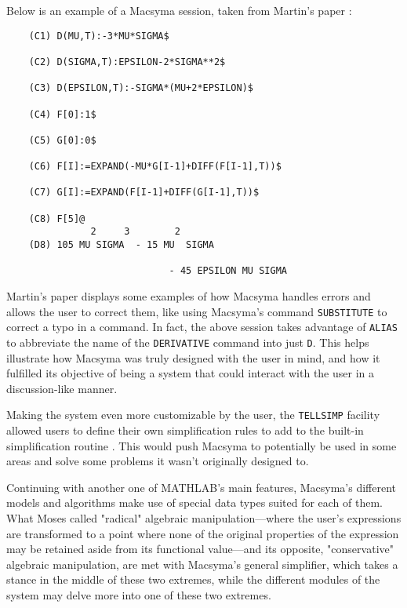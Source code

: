 Below is an example of a Macsyma session, taken from Martin's paper \parencite{martin1971macsyma}:

\begin{verbatim}
    (C1) D(MU,T):-3*MU*SIGMA$
    
    (C2) D(SIGMA,T):EPSILON-2*SIGMA**2$

    (C3) D(EPSILON,T):-SIGMA*(MU+2*EPSILON)$

    (C4) F[0]:1$

    (C5) G[0]:0$

    (C6) F[I]:=EXPAND(-MU*G[I-1]+DIFF(F[I-1],T))$

    (C7) G[I]:=EXPAND(F[I-1]+DIFF(G[I-1],T))$

    (C8) F[5]@
               2     3        2
    (D8) 105 MU SIGMA  - 15 MU  SIGMA

                             - 45 EPSILON MU SIGMA
\end{verbatim}

Martin's paper displays some examples of how Macsyma handles errors and allows the user to correct them, like using Macsyma's command \verb|SUBSTITUTE| to correct a typo in a command. In fact, the above session takes advantage of \verb|ALIAS| to abbreviate the name of the \verb|DERIVATIVE| command into just \verb|D|. This helps illustrate how Macsyma was truly designed with the user in mind, and how it fulfilled its objective of being a system that could interact with the user in a discussion-like manner.

Making the system even more customizable by the user, the \verb|TELLSIMP| facility allowed users to define their own simplification rules to add to the built-in simplification routine \parencite{martin1971macsyma}. This would push Macsyma to potentially be used in some areas and solve some problems it wasn't originally designed to.

Continuing with another one of MATHLAB's main features, Macsyma's different models and algorithms make use of special data types suited for each of them. What Moses \parencite{moses1971algebraic} called "radical" algebraic manipulation---where the user's expressions are transformed to a point where none of the original properties of the expression may be retained aside from its functional value---and its opposite, "conservative" algebraic manipulation, are met with Macsyma's general simplifier, which takes a stance in the middle of these two extremes, while the different modules of the system may delve more into one of these two extremes.

